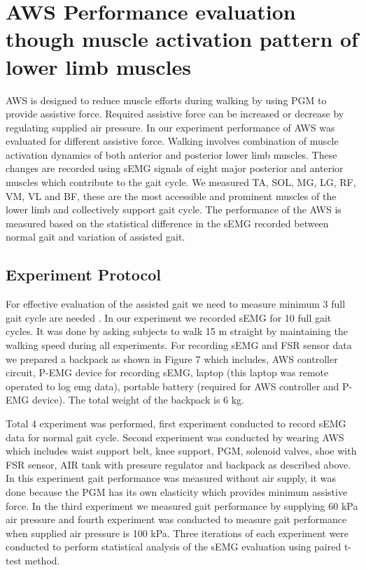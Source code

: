 \documentclass[letterpaper, 10 pt, conference]{ieeeconf}  %
\begin{document}
\section{AWS Performance evaluation though muscle activation pattern of lower limb muscles} \label{Evaluation}
AWS is designed to reduce muscle efforts during walking by using PGM to provide assistive force. Required assistive force can be increased or decrease by regulating supplied air pressure. In our experiment performance of AWS was evaluated for different assistive force. Walking involves combination of muscle activation dynamics of both anterior and posterior lower limb muscles. These changes are recorded using sEMG signals of eight major posterior and anterior muscles which contribute to the gait cycle. We measured TA, SOL, MG, LG, RF, VM, VL and BF, these are the most accessible and prominent muscles of the lower limb and collectively support gait cycle. The performance of the AWS is measured based on the statistical difference in the sEMG recorded between normal gait and variation of assisted gait.

\subsection{Experiment Protocol}
For effective evaluation of the assisted gait we need to measure minimum 3 full gait cycle are needed \cite{10}. In our experiment we recorded sEMG for 10 full gait cycles. It was done by asking subjects to walk 15 m straight by maintaining the walking speed during all experiments. For recording sEMG and FSR sensor data we prepared a backpack as shown in Figure 7 which includes, AWS controller circuit, P-EMG device for recording sEMG, laptop (this laptop was remote operated to log emg data), portable battery (required for AWS controller and P-EMG device). The total weight of the backpack is 6 kg. 

Total 4 experiment was performed, first experiment conducted to record sEMG data for normal gait cycle. Second experiment was conducted by wearing AWS which includes waist support belt, knee support, PGM, solenoid valves, shoe with FSR sensor, AIR tank with pressure regulator and backpack as described above. In this experiment gait performance was measured without air supply, it was done because the PGM has its own elasticity which provides minimum assistive force. In the third experiment we measured gait performance by supplying 60 kPa air pressure and fourth experiment was conducted to measure gait performance when supplied air pressure is 100 kPa. Three iterations of each experiment were conducted to perform statistical analysis of the sEMG evaluation using paired t-test method.  
\end{document}
